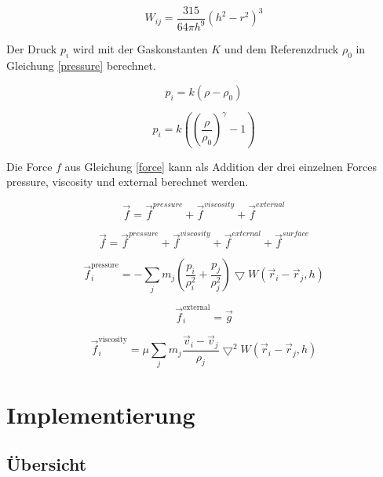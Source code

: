 \documentclass[a4paper]{paper}
\begin{document}
\begin{equation}
\label{poly6}
W_{ij} = \frac{315}{64 \pi h^9} (h^2-r^2)^3
\end{equation}

Der Druck $p_i$ wird mit der Gaskonstanten $K$ und dem Referenzdruck $\rho_0$ in Gleichung \ref{pressure} berechnet.

\begin{equation}
\label{pressure}
p_i = k(\rho-\rho_0)
\end{equation}

\begin{equation}
\label{pressure_tait}
p_i = k((\frac{\rho}{\rho_{0}})^{\gamma}-1)
\end{equation}

Die Force $f$ aus Gleichung \ref{force} kann als Addition der drei einzelnen Forces pressure, viscosity und external berechnet werden.

\begin{equation}
\label{force}
\vec{f} = \vec{f}^{pressure} + \vec{f}^{viscosity} + \vec{f}^{external}
\end{equation}

\begin{equation}
\label{force_with_surface}
\vec{f} = \vec{f}^{pressure} + \vec{f}^{viscosity} + \vec{f}^{external} + \vec{f}^{surface}
\end{equation}


\begin{equation}
\label{force_pressure}
\vec{f}^{\text{pressure}}_{i} = - \sum_{j}m_{j}(\frac{p_{i}}{\rho_{i}^2} +\frac{p_{j}}{\rho_{j}^2})\bigtriangledown W(\vec{r}_{i}-\vec{r}_{j},h)
\end{equation}
	
	\begin{equation}
\label{force_external}
\vec{f}^{\text{external}}_{i} = \vec{g}
\end{equation}

\begin{equation}
\label{force_viscosity}
\vec{f}^{\text{viscosity}}_{i} = \mu \sum_{j}m_{j}\frac{\vec{v}_{i} - \vec{v}_{j}}{\rho_{j}}\bigtriangledown^2 W(\vec{r}_{i}-\vec{r}_{j},h)
\end{equation}


\section{Implementierung}
\subsection{Übersicht}
\end{document}
